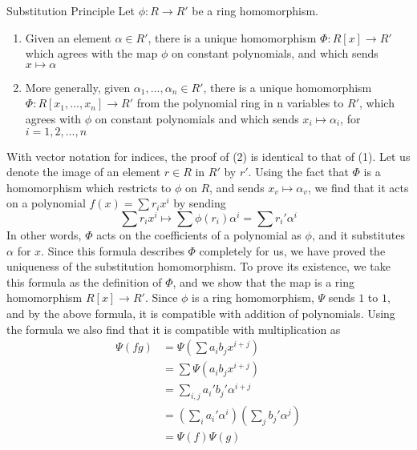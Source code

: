 \documentclass[12pt, a4paper, twoside, openright, titlepage]{book}
\begin{document}
\begin{namthm}{Substitution Principle}{}
        Let $\phi:R\rightarrow R'$ be a ring homomorphism. \begin{enumerate}
                \item Given an element $\alpha \in R'$, there is a unique homomorphism $\Phi: R[x] \rightarrow R'$ which agrees with the map $\phi$ on constant polynomials, and which sends $x \mapsto \alpha$
                \item More generally, given $\alpha_1,...,\alpha_n \in R'$, there is a unique homomorphism $\Phi: R[x_1,...,x_n] \rightarrow R'$ from the polynomial ring in n variables to $R'$, which agrees with $\phi$ on constant polynomials and which sends $x_i\mapsto \alpha_i$, for $i=1,2,...,n$
        \end{enumerate}
\end{namthm}
\begin{proof*}{}{}
        With vector notation for indices, the proof of (2) is identical to that of (1). Let us denote the image of an element $r \in R$ in $R'$ by $r'$. Using the fact that $\Phi$ is a homomorphism which restricts to $\phi$ on $R$, and sends $x_v \mapsto \alpha_v$, we find that it acts on a polynomial $f(x) = \sum r_ix^i$ by sending \begin{equation}
                \sum r_ix^i \mapsto \sum\phi(r_i)\alpha^i = \sum r_i'\alpha^i
        \end{equation}
        In other words, $\Phi$ acts on the coefficients of a polynomial as $\phi$, and it substitutes $\alpha$ for $x$. Since this formula describes $\Phi$ completely for us, we have proved the uniqueness of the substitution homomorphism. To prove its existence, we take this formula as the definition of $\Phi$, and we show that the map is a ring homomorphism $R[x] \rightarrow R'$. Since $\phi$ is a ring homomorphism, $\Psi$ sends $1$ to $1$, and by the above formula, it is compatible with addition of polynomials. Using the formula we also find that it is compatible with multiplication as \begin{align*}
                \Psi(fg) &= \Psi\left(\sum a_ib_jx^{i+j}\right) \\
                &= \sum \Psi(a_ib_jx^{i+j})\\
                &= \sum\limits_{i,j} a_i'b_j'\alpha^{i+j}\\
                &= \left(\sum\limits_ia_i'\alpha^i\right)\left(\sum\limits_jb_j'\alpha^j\right) \\
                &=\Psi(f)\Psi(g)
        \end{align*}
\end{proof*}
\end{document}
